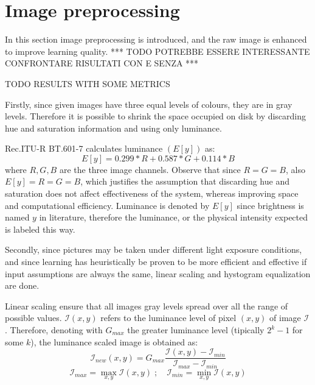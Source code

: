 \section{Image preprocessing}\label{section:image_preprocessing}
    \par{
        In this section image preprocessing is introduced, and the raw image is enhanced to improve learning quality. *** TODO POTREBBE ESSERE INTERESSANTE CONFRONTARE RISULTATI CON E SENZA ***
    }
    \begin{table}
        \caption{TODO RESULTS WITH SOME METRICS}
    \end{table}
    \par{
        Firstly, since given images have three equal levels of colours, they are in gray levels. Therefore it is possible to shrink the space occupied on disk by discarding hue and saturation information and using only luminance.
    }
    \par{
        Rec.ITU-R BT.601-7 calculates luminance $\left(E\left[y\right]\right)$ as:
        $$ E\left[y\right] = 0.299 * R + 0.587 * G + 0.114 * B $$
        where $R,G,B$ are the three image channels. Observe that since $R = G = B$, also $E\left[y\right] = R = G = B$, which justifies the assumption that discarding hue and saturation does not affect effectiveness of the system, whereas improving space and computational efficiency. Luminance is denoted by $E\left[y\right]$ since brightness is named $y$ in literature, therefore the luminance, or the physical intensity expected is labeled this way.
    }
    \par{
        Secondly, since pictures may be taken under different light exposure conditions, and since learning has heuristically be proven to be more efficient and effective if input assumptions are always the same, linear scaling and hystogram equalization are done.
    }
    \par{
        Linear scaling ensure that all images gray levels spread over all the range of possible values. $\mathcal{I}\left(x,y\right)$ refers to the luminance level of pixel $\left(x,y\right)$ of image $\mathcal{I}$. Therefore, denoting with $G_{max}$ the greater luminance level (tipically $2^k - 1$ for some $k$), the luminance scaled image is obtained as:
        $$\mathcal{I}_{new}\left(x,y\right) = G_{max} \frac{\mathcal{I}\left(x,y\right) - \mathcal{I}_{min}}{\mathcal{I}_{max} - \mathcal{I}_{min}}$$
        $$\mathcal{I}_{max} = \max_{x,y} \mathcal{I}\left(x,y\right)\;;\quad\mathcal{I}_{min} = \min_{x,y} \mathcal{I}\left(x,y\right)$$
    }
